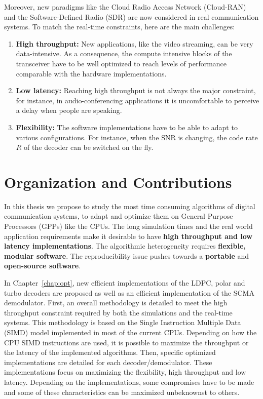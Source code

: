 Moreover, new paradigms like the Cloud Radio Access Network (Cloud-RAN) and the
Software-Defined Radio (SDR) are now considered in real communication systems.
To match the real-time constraints, here are the main challenges:

\begin{enumerate}
  \item \textbf{High throughput:} New applications, like the video streaming,
    can be very data-intensive. As a consequence, the compute intensive blocks
    of the transceiver have to be well optimized to reach levels of performance
    comparable with the hardware implementations.
  \item \textbf{Low latency:} Reaching high throughput is not always the major
    constraint, for instance, in audio-conferencing applications it is
    uncomfortable to perceive a delay when people are speaking.
  \item \textbf{Flexibility:} The software implementations have to be able to
    adapt to various configurations. For instance, when the SNR is changing,
    the code rate $R$ of the decoder can be switched on the fly.
\end{enumerate}

\section{Organization and Contributions}

In this thesis we propose to study the most time consuming algorithms of digital
communication systems, to adapt and optimize them on General Purpose Processors
(GPPs) like the CPUs. The long simulation times and the real world application
requirements make it desirable to have \textbf{high throughput and low latency
implementations}. The algorithmic heterogeneity requires \textbf{flexible,
modular software}. The reproducibility issue pushes towards a \textbf{portable}
and \textbf{open-source software}.

In Chapter~\ref{chap:opt}, new efficient implementations of the LDPC, polar and
turbo decoders are proposed as well as an efficient implementation of the SCMA
demodulator. First, an overall methodology is detailed to meet the high
throughput constraint required by both the simulations and the real-time
systems. This methodology is based on the Single Instruction Multiple Data
(SIMD) model implemented in most of the current CPUs. Depending on how the CPU
SIMD instructions are used, it is possible to maximize the throughput or the
latency of the implemented algorithms. Then, specific optimized implementations
are detailed for each decoder/demodulator. These implementations focus on
maximizing the flexibility, high throughput and low latency. Depending on the
implementations, some compromises have to be made and some of these
characteristics can be maximized unbeknownst to others.

